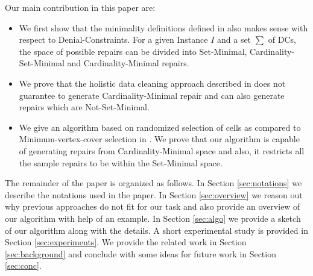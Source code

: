 Our main contribution in this paper are:
\begin{itemize}
\item We first show that the minimality definitions defined in \cite{Beskales_journal} also makes sense with respect to Denial-Constraints.
For a given Instance $I$ and a set $\sum$ of DCs, the space of possible repairs can be divided into Set-Minimal, Cardinality-Set-Minimal and Cardinality-Minimal repairs.
\item We prove that the holistic data cleaning approach described in \cite{XuChu} does not guarantee to generate Cardinality-Minimal repair and can also generate repairs which are Not-Set-Minimal.
\item We give an algorithm based on randomized selection of cells as compared to Minimum-vertex-cover selection in \cite{XuChu}.
We prove that our algorithm is capable of generating repairs from Cardinality-Minimal space and also, it restricts all the sample repairs to be within the Set-Minimal space.
\end{itemize}

The remainder of the paper is organized as follows.
In Section \ref{sec:notations} we describe the notations used in the paper.
In Section \ref{sec:overview} we reason out why previous approaches do not fit for our task and also provide an overview of our algorithm with help of an example.
In Section \ref{sec:algo} we provide a sketch of our algorithm along with the details.
A short experimental study is provided in Section \ref{sec:experiments}.
We provide the related work in Section \ref{sec:background} and conclude with some ideas for future work in Section \ref{sec:conc}.
